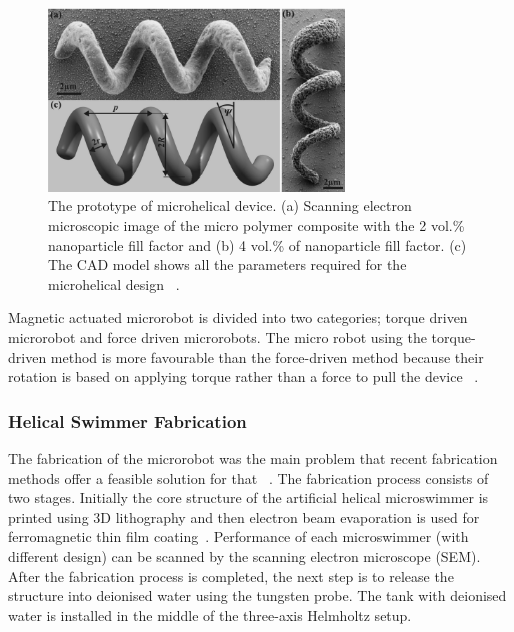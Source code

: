 \documentclass[a4paper,11pt]{article}
\begin{document}
\begin{sloppypar}
\begin{figure}
  \centering
    \includegraphics[width=0.7\textwidth]{8}
  \caption{ The prototype of microhelical device. (a) Scanning electron microscopic image of the micro polymer composite
with the 2 vol.\% nanoparticle fill factor and (b) 4 vol.\% of nanoparticle fill factor. (c) The CAD model
shows all the parameters required for the microhelical design ~\citep{peyer2013bacteria}.}
  \label{ref8}
\end{figure}

Magnetic actuated microrobot is divided into two categories; torque driven microrobot and force
 driven microrobots.
The micro robot using the torque-driven method is more favourable than the force-driven method 
because their rotation is based on applying torque rather than a force to pull the device ~\citep{peyer2013bacteria}.

\paragraph{} 
\subsubsection{Helical Swimmer Fabrication}
The fabrication of the microrobot was the main problem that recent fabrication methods 
offer a feasible solution for that ~\citep{gao2013bioinspired}. 
The fabrication process consists of two stages. Initially the core structure of the artificial helical 
microswimmer is printed using 3D lithography and then electron beam evaporation is used for 
ferromagnetic thin film coating~\citep{tottori2013artificial}.  
Performance of each microswimmer (with different design) can be scanned by the scanning electron
 microscope (SEM). After the fabrication process is completed, the next step is to release the structure into 
deionised water using the tungsten probe. The tank with deionised water is installed in the middle of the 
three-axis Helmholtz setup. 


\end{sloppypar}
\end{document}
